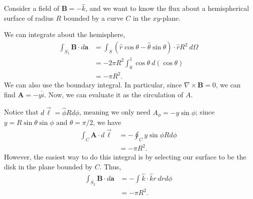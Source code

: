 \documentclass[10pt]{mypackage}
\begin{document}
\begin{example}
  Consider a field of $\mathbf{B} = -\widehat{k}$, and we want to know the flux about a hemispherical surface of radius $R$ bounded by a curve $C$ in the $xy$-plane.\newline

  We can integrate about the hemisphere,
  \begin{align*}
    \int_{S_1}^{} \mathbf{B}\cdot d\mathbf{a} &= \int_{S}^{} \left(\widehat{r}\cos\theta - \widehat{\theta}\sin\theta\right)\cdot\widehat{r}R^2\:d\Omega\\
                                            &= -2\pi R^2\int_{0}^{1} \cos\theta\:d\left(\cos\theta\right)\\
                                            &= -\pi R^2.
  \end{align*}
  We can also use the boundary integral. In particular, since $\nabla \times \mathbf{B} = 0$, we can find $\mathbf{A} = -y\widehat{i}$. Now, we can evaluate it as the circulation of $A$.\newline

  Notice that $d\vec{\ell} = \widehat{\phi}Rd\phi$, meaning we only need $A_{\phi} = -y\sin\phi$; since $y = R\sin\theta\sin\phi$ and $\theta = \pi/2$, we have
  \begin{align*}
    \int_{C}^{} \mathbf{A}\cdot d\vec{\ell} &= -\oint_{C} y\sin\phi Rd\phi\\
                                            &= -\pi R^2.
  \end{align*}
  However, the easiest way to do this integral is by selecting our surface to be the disk in the plane bounded by $C$. Thus,
  \begin{align*}
    \int_{S_2}^{} \mathbf{B}\cdot d\mathbf{a} &= -\int_{}^{} \widehat{k}\cdot \widehat{k} r\:drd\phi\\
                                              &= -\pi R^2.
  \end{align*}
\end{example}
\end{document}
